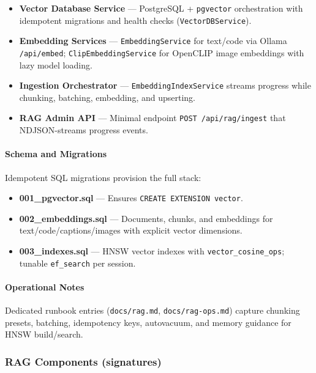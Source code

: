 \documentclass[11pt]{article}
\begin{document}
\begin{itemize}
  \item \textbf{Vector Database Service} — PostgreSQL + \texttt{pgvector} orchestration with idempotent migrations and health checks (\texttt{VectorDBService}).
  \item \textbf{Embedding Services} — \texttt{EmbeddingService} for text/code via Ollama \texttt{/api/embed}; \texttt{ClipEmbeddingService} for OpenCLIP image embeddings with lazy model loading.
  \item \textbf{Ingestion Orchestrator} — \texttt{EmbeddingIndexService} streams progress while chunking, batching, embedding, and upserting.
  \item \textbf{RAG Admin API} — Minimal endpoint \texttt{POST /api/rag/ingest} that NDJSON-streams progress events.
\end{itemize}

\paragraph{Schema and Migrations}
Idempotent SQL migrations provision the full stack:

\begin{itemize}
  \item \textbf{001\_pgvector.sql} — Ensures \texttt{CREATE EXTENSION vector}.
  \item \textbf{002\_embeddings.sql} — Documents, chunks, and embeddings for text/code/captions/images with explicit vector dimensions.
  \item \textbf{003\_indexes.sql} — HNSW vector indexes with \texttt{vector\_cosine\_ops}; tunable \texttt{ef\_search} per session.
\end{itemize}

\paragraph{Operational Notes}
Dedicated runbook entries (\texttt{docs/rag.md}, \texttt{docs/rag-ops.md}) capture chunking presets, batching, idempotency keys, autovacuum, and memory guidance for HNSW build/search.

\subsubsection{RAG Components (signatures)}
\end{document}
